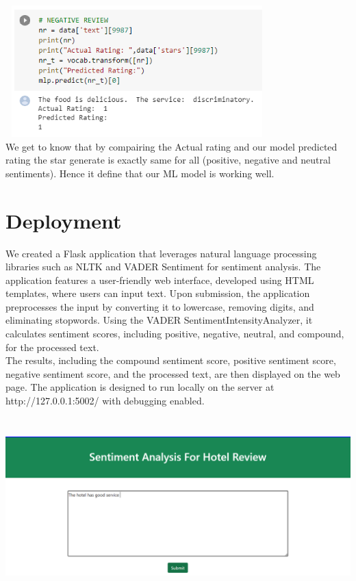 \documentclass[a4paper, 12pt]{report}
\begin{document}
\includegraphics[height=2in,width=4in]{29}\\
 We get to know that by compairing the Actual rating and our model predicted rating the star generate is exactly same for all (positive, negative and neutral sentiments). Hence it define that our ML model is working well.
\section{Deployment}
We created a Flask application that leverages natural language processing libraries such as NLTK and VADER Sentiment for sentiment analysis. The application features a user-friendly web interface, developed using HTML templates, where users can input text. Upon submission, the application preprocesses the input by converting it to lowercase, removing digits, and eliminating stopwords. Using the VADER SentimentIntensityAnalyzer, it calculates sentiment scores, including positive, negative, neutral, and compound, for the processed text.\\
 The results, including the compound sentiment score, positive sentiment score, negative sentiment score, and the processed text, are then displayed on the web page. The application is designed to run locally on the server at http://127.0.0.1:5002/ with debugging enabled.\\
 \includegraphics[height=3in,width=6in]{31}\\
\end{document}
